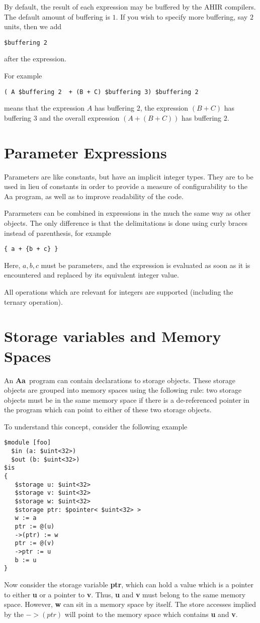 \documentclass{article}
\newcommand{\Aa}{{\bf Aa}~}
\begin{document}
By default, the result of each expression may be
buffered by the AHIR compilers.  The default amount of
buffering is $1$.  If you wish to specify more buffering, 
say $2$ units, then we add 
\begin{verbatim}
$buffering 2
\end{verbatim}
after the expression.

For example
\begin{verbatim}
( A $buffering 2  + (B + C) $buffering 3) $buffering 2
\end{verbatim}
means that the expression $A$ has buffering $2$,
the expression $(B+C)$ has buffering $3$ and the
overall expression $(A + (B+C))$ has buffering $2$.

\section{Parameter Expressions} \label{sec:ParamExprs}

Parameters are like constants, but have an implicit
integer types.  They are to be used in lieu of
constants in order to provide a measure of configurability
to the Aa program, as well as to improve readability of
the code. 

Pararmeters can be combined in expressions in the
much the same way as other objects.  The only difference
is that the delimitations is done using curly braces
instead of parenthesis, for example
\begin{verbatim}
{ a + {b + c} }
\end{verbatim}
Here, $a,b,c$ must be parameters, and the expression
is evaluated as soon as it is encountered and replaced
by its equivalent integer value.

All operations which are relevant for integers
are supported (including the ternary operation).


\section{Storage variables and Memory Spaces}

An \Aa program can contain declarations to storage objects.  These
storage objects are grouped into memory spaces using
the following rule: two storage objects must be in the same
memory space if there is a de-referenced pointer in the
program which can point to either of these two storage objects.

To understand this concept, consider the following
example
\begin{verbatim}
$module [foo] 
  $in (a: $uint<32>)
  $out (b: $uint<32>) 
$is
{
   $storage u: $uint<32>
   $storage v: $uint<32>
   $storage w: $uint<32>
   $storage ptr: $pointer< $uint<32> >
   w := a
   ptr := @(u)
   ->(ptr) := w
   ptr := @(v)
   ->ptr := u
   b := u
}
\end{verbatim}
Now consider the storage variable {\bf ptr}, which can hold a value which
is a pointer to either {\bf u} or a pointer to {\bf v}.  Thus,
{\bf u} and {\bf v} must belong to the same memory space.
However, {\bf w} can sit in a memory space by itself.  The
store accesses implied by the $->(ptr)$ will point to the
memory space which contains {\bf u} and {\bf v}.
\end{document}
